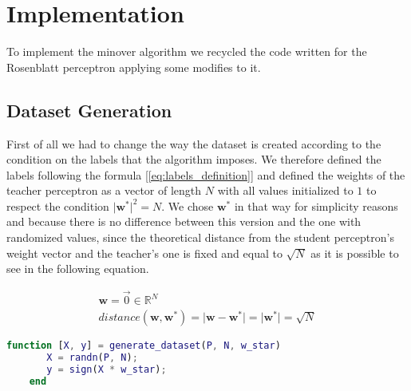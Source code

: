 \section{Implementation}
\label{sec:implementation}



To implement the minover algorithm we recycled the code written for the Rosenblatt perceptron applying some modifies to it.

\subsection{Dataset Generation}
First of all we had to change the way the dataset is created according to the condition on the labels that the algorithm imposes.
We therefore defined the labels following the formula [\ref{eq:labels_definition}] and defined the weights of the teacher perceptron
as a vector of length $N$ with all values initialized to $1$ to respect the condition $\lvert \mathsf{\bm{w}}^* \rvert^2 = N$.
We chose $\mathsf{\bm{w}}^*$ in that way for simplicity reasons and because there is no difference between this version and
the one with randomized values, since the theoretical distance from the student perceptron's weight vector and the teacher's one is
fixed and equal to $\sqrt{N}$ as it is possible to see in the following equation.

\begin{gather*}
    \mathsf{\bm{w}} = \overrightarrow{0} \in \mathbb{R}^N \\
    distance(\mathsf{\bm{w}}, \mathsf{\bm{w}}^*) = \lvert \mathsf{\bm{w}} - \mathsf{\bm{w}}^* \rvert = \lvert \mathsf{\bm{w}}^* \rvert = \sqrt{N}
\end{gather*}

\begin{lstlisting}[language=Matlab]
    function [X, y] = generate_dataset(P, N, w_star)
       X = randn(P, N);
       y = sign(X * w_star);
    end
\end{lstlisting}

